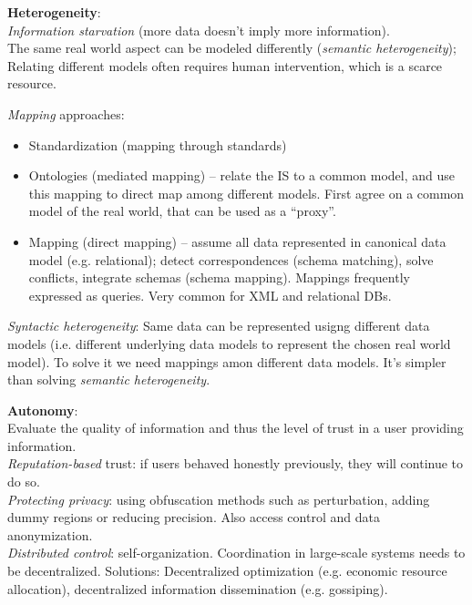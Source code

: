 \textbf{Heterogeneity}:\\
\emph{Information starvation} (more data doesn't imply more information).\\
The same real world aspect can be modeled differently (\emph{semantic heterogeneity}); Relating different models often requires human intervention, which is a scarce resource.

\emph{Mapping} approaches:
\begin{itemize}
	\item Standardization (mapping through standards)
	\item Ontologies (mediated mapping) -- relate the IS to a common model, and use this mapping to direct map among different models. First agree on a common model of the real world, that can be used as a ``proxy''.
	\item Mapping (direct mapping) -- assume all data represented in canonical data model (e.g. relational); detect correspondences (schema matching), solve conflicts, integrate schemas (schema mapping). Mappings frequently expressed as queries. Very common for XML and relational DBs.
\end{itemize}

\emph{Syntactic heterogeneity}: Same data can be represented usigng different data models (i.e. different underlying data models to represent the chosen real world model). To solve it we need mappings amon different data models. It's simpler than solving \emph{semantic heterogeneity}.

\textbf{Autonomy}:\\
Evaluate the quality of information and thus the level of trust in a user providing information.\\
\emph{Reputation-based} trust: if users behaved honestly previously, they will continue to do so.\\
\emph{Protecting privacy}: using obfuscation methods such as perturbation, adding dummy regions or reducing precision. Also access control and data anonymization.\\
\emph{Distributed control}: self-organization. Coordination in large-scale systems needs to be decentralized. Solutions: Decentralized optimization (e.g. economic resource allocation), decentralized information dissemination (e.g. gossiping).

